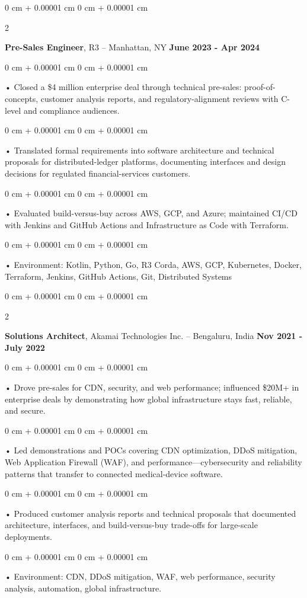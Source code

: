 \documentclass[10pt, letterpaper]{article}
\newenvironment{onecolentry}{
    \begin{adjustwidth}{
        0 cm + 0.00001 cm
    }{
        0 cm + 0.00001 cm
    }
}{
    \end{adjustwidth}
} %
\newenvironment{twocolentry}[2][]{
    \onecolentry
    \def\secondColumn{#2}
    \setcolumnwidth{\fill, 4.5 cm}
    \begin{paracol}{2}
}{
    \switchcolumn \raggedleft \secondColumn
    \end{paracol}
    \endonecolentry
} %
\begin{document}
        \begin{twocolentry}{
            \textbf{June 2023 - Apr 2024}
        }
            \textbf{Pre-Sales Engineer}, R3 -- Manhattan, NY\end{twocolentry}


        \begin{onecolentry}
             • Closed a \$4 million enterprise deal through technical pre-sales: proof-of-concepts, customer analysis reports, and regulatory-alignment reviews with C-level and compliance audiences.
        \end{onecolentry}
        \begin{onecolentry}
             • Translated formal requirements into software architecture and technical proposals for distributed-ledger platforms, documenting interfaces and design decisions for regulated financial-services customers.
        \end{onecolentry}
        \begin{onecolentry}
             • Evaluated build-versus-buy across AWS, GCP, and Azure; maintained CI/CD with Jenkins and GitHub Actions and Infrastructure as Code with Terraform.
        \end{onecolentry}
        \begin{onecolentry}
             • Environment: Kotlin, Python, Go, R3 Corda, AWS, GCP, Kubernetes, Docker, Terraform, Jenkins, GitHub Actions, Git, Distributed Systems
        \end{onecolentry}
        \vspace{0.1cm}

        \begin{twocolentry}{
            \textbf{Nov 2021 - July 2022}
        }
            \textbf{Solutions Architect}, Akamai Technologies Inc. -- Bengaluru, India \end{twocolentry}
        \begin{onecolentry}
            • Drove pre-sales for CDN, security, and web performance; influenced \$20M+ in enterprise deals by demonstrating how global infrastructure stays fast, reliable, and secure.
        \end{onecolentry}
        \begin{onecolentry}
            • Led demonstrations and POCs covering CDN optimization, DDoS mitigation, Web Application Firewall (WAF), and performance---cybersecurity and reliability patterns that transfer to connected medical-device software.
        \end{onecolentry}
        \begin{onecolentry}
             • Produced customer analysis reports and technical proposals that documented architecture, interfaces, and build-versus-buy trade-offs for large-scale deployments.
        \end{onecolentry}
        \begin{onecolentry}
             • Environment: CDN, DDoS mitigation, WAF, web performance, security analysis, automation, global infrastructure.
        \end{onecolentry}
\end{document}

